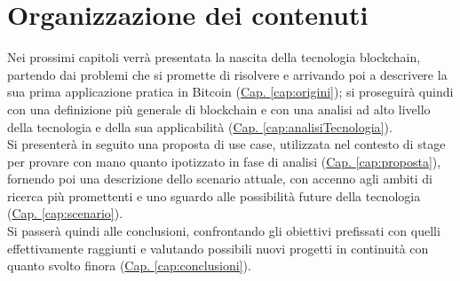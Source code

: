 \section{Organizzazione dei contenuti}
	Nei prossimi capitoli verrà presentata la nascita della tecnologia blockchain, partendo dai problemi che si promette di risolvere e arrivando poi a descrivere la sua prima applicazione pratica in Bitcoin (\hyperref[cap:origini]{Cap. \ref*{cap:origini}}); si proseguirà quindi con una definizione più generale di blockchain e con una analisi ad alto livello della tecnologia e della sua applicabilità (\hyperref[cap:analisiTecnologia]{Cap. \ref*{cap:analisiTecnologia}}). \\
	Si presenterà in seguito una proposta di use case, utilizzata nel contesto di stage per provare con mano quanto ipotizzato in fase di analisi (\hyperref[cap:proposta]{Cap. \ref*{cap:proposta}}), fornendo poi una descrizione dello scenario attuale, con accenno agli ambiti di ricerca più promettenti e uno sguardo alle possibilità future della tecnologia (\hyperref[cap:scenario]{Cap. \ref*{cap:scenario}}). \\
	Si passerà quindi alle conclusioni, confrontando gli obiettivi prefissati con quelli effettivamente raggiunti e valutando possibili nuovi progetti in continuità con quanto svolto finora (\hyperref[cap:conclusioni]{Cap. \ref*{cap:conclusioni}}).